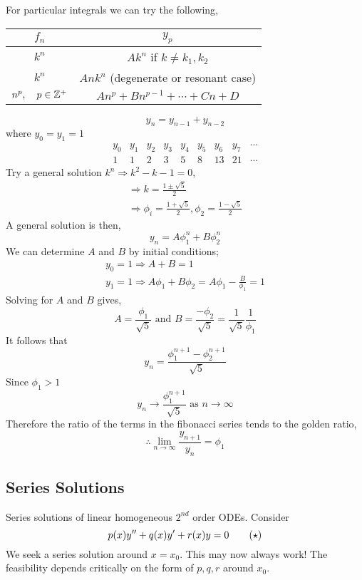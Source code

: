 \documentclass{article}
\begin{document}
For particular integrals we can try the following,
\begin{center}
    \begin{tabular}{c|c}
        $f_n$ & $y_p$ \\
        \hline
        $k^n$ & $Ak^n$ if $k \neq k_1, k_2$ \\
        $k^n$ & $Ank^n$ (degenerate or resonant case) \\
        $n^p, \quad p \in \mathbb{Z}^+$ & $An^p + Bn^{p-1} + \cdots + Cn + D$
    \end{tabular}
\end{center}

\begin{eg}
    \[
        y_n = y_{n-1} + y_{n-2}  
    \]
    where $y_0 = y_1 = 1$
    \[
        \begin{array}{ccccccccc}
            y_0 & y_1 & y_2 & y_3 & y_4 & y_5 & y_6 & y_7 & \cdots \\
            \hline
            1   & 1   & 2   & 3   & 5   & 8   & 13  & 21 & \cdots
        \end{array}  
    \]
    Try a general solution $k^n \Rightarrow k^2 - k - 1 = 0$,
    \begin{align*}
        \Rightarrow k = \frac{1 \pm \sqrt{5}}{2} \\
        \Rightarrow \phi_i = \frac{1 + \sqrt{5}}{2}, \phi_2 = \frac{1 - \sqrt{5}}{2}
    \end{align*}
    A general solution is then,
    \[
        y_n = A \phi_1^n + B \phi_2^n  
    \]
    We can determine $A$ and $B$ by initial conditions;
    \begin{align*}
        y_0 = 1 \Rightarrow A + B = 1 \\
        y_1 = 1 \Rightarrow A \phi_1 + B \phi_2 = A \phi_1 - \frac{B}{\phi_1} = 1
    \end{align*}
    Solving for $A$ and $B$ gives,
    \[
        A = \frac{\phi_1}{\sqrt{5}} \text{ and } B = \frac{-\phi_2}{\sqrt{5}} = \frac{1}{\sqrt{5}} \frac{1}{\phi_1}
    \]
    It follows that
    \[
        y_n = \frac{\phi_1^{n+1} - \phi_2^{n+1}}{\sqrt{5}}  
    \]
    Since $\phi_1 > 1$
    \[
        y_n \rightarrow \frac{\phi_1^{n+1}}{\sqrt{5}} \text{ as } n \rightarrow \infty
    \]
    Therefore the ratio of the terms in the fibonacci series tends to the golden ratio,
    \[
        \therefore \lim_{n \rightarrow \infty} \frac{y_{n+1}}{y_n} = \phi_1  
    \]
\end{eg}

\subsection{Series Solutions}
Series solutions of linear homogeneous $2^{nd}$ order ODEs. Consider
\[
    p(x) y'' + q(x) y' + r(x) y = 0 \tagstar
\]
We seek a series solution around $x = x_0$. This may now always work!
The feasibility depends critically on the form of $p, q, r$ around $x_0$.
\end{document}
